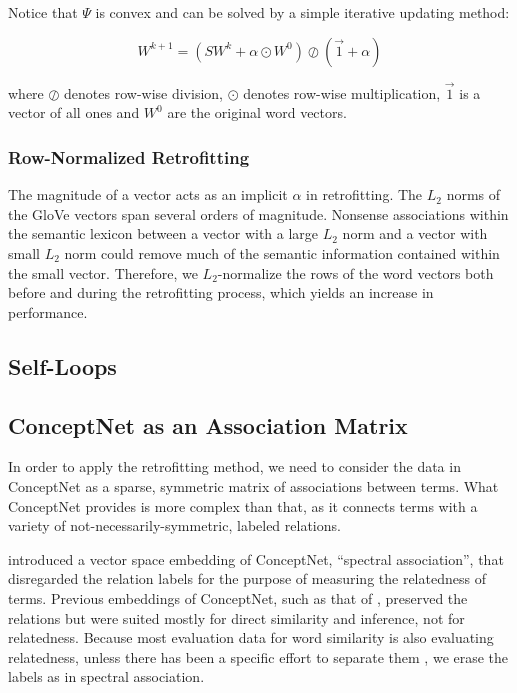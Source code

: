 \documentclass[letterpaper]{article}
\begin{document}
Notice that $\Psi$ is convex and can be solved by a simple iterative updating
method:

$$
W^{k+1} = \left( S W^k + \alpha \odot W^0 \right)
\oslash \left( \vec{1} + \alpha \right)
$$

where $\oslash$ denotes row-wise division, $\odot$ denotes row-wise
multiplication, $\vec{1}$ is a vector of all ones and $W^0$ are the original
word vectors.

\subsubsection{Row-Normalized Retrofitting}

The magnitude of a vector acts as an implicit $\alpha$ in retrofitting.
The $L_2$ norms of the GloVe vectors span several orders of magnitude.
Nonsense associations within the semantic lexicon between a vector with a large
$L_2$ norm and a vector with small $L_2$ norm could remove much of the semantic
information contained within the small vector. Therefore, we $L_2$-normalize
the rows of the word vectors both before and during the retrofitting process,
which yields an increase in performance.

\subsection{Self-Loops}

\subsection{ConceptNet as an Association Matrix}

In order to apply the retrofitting method, we need to consider the data in
ConceptNet as a sparse, symmetric matrix of associations between terms. What
ConceptNet provides is more complex than that, as it connects terms with a
variety of not-necessarily-symmetric, labeled relations.

 introduced a vector space embedding of ConceptNet,
``spectral association'', that disregarded the relation labels for the purpose
of measuring the relatedness of terms. Previous embeddings of ConceptNet, such
as that of , preserved the relations but were
suited mostly for direct similarity and inference, not for relatedness. Because
most evaluation data for word similarity is also evaluating relatedness, unless
there has been a specific effort to separate them \cite{agirre2009similarity},
we erase the labels as in spectral association.
\end{document}
